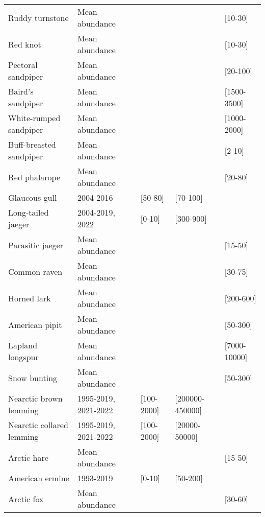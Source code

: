 \begin{table}[ht]
\begin{tabularx}{\textwidth}{lllll}
  Ruddy turnstone & Mean abundance &  &  & [10-30] \\ 
  Red knot & Mean abundance &  &  & [10-30] \\ 
  Pectoral sandpiper & Mean abundance &  &  & [20-100] \\ 
  Baird's sandpiper & Mean abundance &  &  & [1500-3500] \\ 
  White-rumped sandpiper & Mean abundance &  &  & [1000-2000] \\ 
  Buff-breasted sandpiper & Mean abundance &  &  & [2-10] \\ 
  Red phalarope & Mean abundance &  &  & [20-80] \\ 
  Glaucous gull & 2004-2016 & [50-80] & [70-100] &  \\ 
  Long-tailed jaeger & 2004-2019, 2022 & [0-10] & [300-900] &  \\ 
  Parasitic jaeger & Mean abundance &  &  & [15-50] \\ 
  Common raven & Mean abundance &  &  & [30-75] \\ 
  Horned lark & Mean abundance &  &  & [200-600] \\ 
  American pipit & Mean abundance &  &  & [50-300] \\ 
  Lapland longspur & Mean abundance &  &  & [7000-10000] \\ 
  Snow bunting & Mean abundance &  &  & [50-300] \\ 
  Nearctic brown lemming & 1995-2019, 2021-2022 & [100-2000] & [200000-450000] &  \\ 
  Nearctic collared lemming & 1995-2019, 2021-2022 & [100-2000] & [20000-50000] &  \\ 
  Arctic hare & Mean abundance &  &  & [15-50] \\ 
  American ermine & 1993-2019 & [0-10] & [50-200] &  \\ 
  Arctic fox & Mean abundance &  &  & [30-60] \\ 
   \hline
\end{tabularx}
\endgroup
\end{table}
